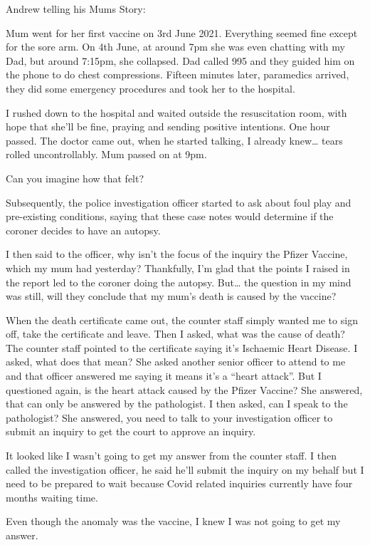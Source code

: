 Andrew telling his Mums Story:

Mum went for her first vaccine on 3rd June 2021. Everything seemed fine except
for the sore arm. On 4th June, at around 7pm she was even chatting with my Dad,
but around 7:15pm, she collapsed. Dad called 995 and they guided him on the
phone to do chest compressions. Fifteen minutes later, paramedics arrived, they
did some emergency procedures and took her to the hospital.

I rushed down to the hospital and waited outside the resuscitation room, with
hope that she’ll be fine, praying and sending positive intentions. One hour
passed. The doctor came out, when he started talking, I already knew… tears
rolled uncontrollably. Mum passed on at 9pm.

Can you imagine how that felt?

Subsequently, the police investigation officer started to ask about foul play
and pre-existing conditions, saying that these case notes would determine if the
coroner decides to have an autopsy.

I then said to the officer, why isn’t the focus of the inquiry the Pfizer
Vaccine, which my mum had yesterday? Thankfully, I’m glad that the points I
raised in the report led to the coroner doing the autopsy. But… the question in
my mind was still, will they conclude that my mum’s death is caused by the
vaccine?

When the death certificate came out, the counter staff simply wanted me to sign
off, take the certificate and leave. Then I asked, what was the cause of death?
The counter staff pointed to the certificate saying it’s Ischaemic Heart
Disease. I asked, what does that mean? She asked another senior officer to
attend to me and that officer answered me saying it means it’s a “heart
attack”. But I questioned again, is the heart attack caused by the Pfizer
Vaccine? She answered, that can only be answered by the pathologist. I then
asked, can I speak to the pathologist? She answered, you need to talk to your
investigation officer to submit an inquiry to get the court to approve an
inquiry.

It looked like I wasn’t going to get my answer from the counter staff. I then
called the investigation officer, he said he’ll submit the inquiry on my behalf
but I need to be prepared to wait because Covid related inquiries currently have
four months waiting time.

Even though the anomaly was the vaccine, I knew I was not going to get my
answer.

